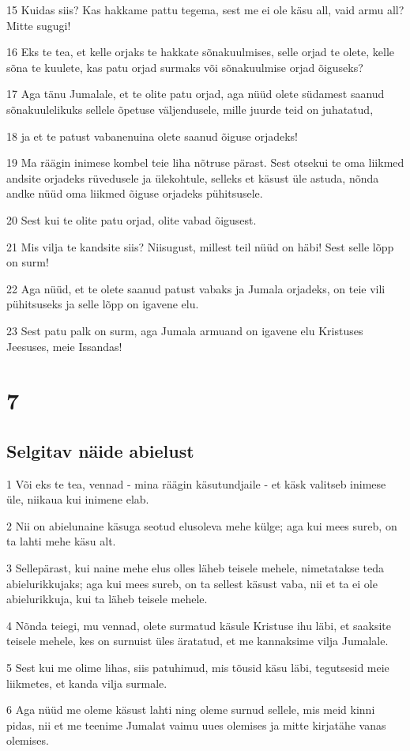 \par 15 Kuidas siis? Kas hakkame pattu tegema, sest me ei ole käsu all, vaid armu all? Mitte sugugi!
\par 16 Eks te tea, et kelle orjaks te hakkate sõnakuulmises, selle orjad te olete, kelle sõna te kuulete, kas patu orjad surmaks või sõnakuulmise orjad õiguseks?
\par 17 Aga tänu Jumalale, et te olite patu orjad, aga nüüd olete südamest saanud sõnakuulelikuks sellele õpetuse väljendusele, mille juurde teid on juhatatud,
\par 18 ja et te patust vabanenuina olete saanud õiguse orjadeks!
\par 19 Ma räägin inimese kombel teie liha nõtruse pärast. Sest otsekui te oma liikmed andsite orjadeks rüvedusele ja ülekohtule, selleks et käsust üle astuda, nõnda andke nüüd oma liikmed õiguse orjadeks pühitsusele.
\par 20 Sest kui te olite patu orjad, olite vabad õigusest.
\par 21 Mis vilja te kandsite siis? Niisugust, millest teil nüüd on häbi! Sest selle lõpp on surm!
\par 22 Aga nüüd, et te olete saanud patust vabaks ja Jumala orjadeks, on teie vili pühitsuseks ja selle lõpp on igavene elu.
\par 23 Sest patu palk on surm, aga Jumala armuand on igavene elu Kristuses Jeesuses, meie Issandas!


\chapter{7}

\section*{Selgitav näide abielust}

\par 1 Või eks te tea, vennad - mina räägin käsutundjaile - et käsk valitseb inimese üle, niikaua kui inimene elab.
\par 2 Nii on abielunaine käsuga seotud elusoleva mehe külge; aga kui mees sureb, on ta lahti mehe käsu alt.
\par 3 Sellepärast, kui naine mehe elus olles läheb teisele mehele, nimetatakse teda abielurikkujaks; aga kui mees sureb, on ta sellest käsust vaba, nii et ta ei ole abielurikkuja, kui ta läheb teisele mehele.
\par 4 Nõnda teiegi, mu vennad, olete surmatud käsule Kristuse ihu läbi, et saaksite teisele mehele, kes on surnuist üles äratatud, et me kannaksime vilja Jumalale.
\par 5 Sest kui me olime lihas, siis patuhimud, mis tõusid käsu läbi, tegutsesid meie liikmetes, et kanda vilja surmale.
\par 6 Aga nüüd me oleme käsust lahti ning oleme surnud sellele, mis meid kinni pidas, nii et me teenime Jumalat vaimu uues olemises ja mitte kirjatähe vanas olemises.

